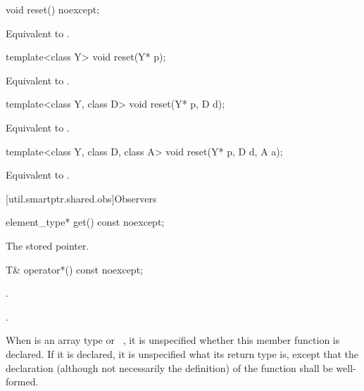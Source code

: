%
\begin{itemdecl}
void reset() noexcept;
\end{itemdecl}

\begin{itemdescr}
\pnum
\effects
Equivalent to .
\end{itemdescr}

%
\begin{itemdecl}
template<class Y> void reset(Y* p);
\end{itemdecl}

\begin{itemdescr}
\pnum
\effects
Equivalent to .
\end{itemdescr}

%
\begin{itemdecl}
template<class Y, class D> void reset(Y* p, D d);
\end{itemdecl}

\begin{itemdescr}
\pnum
\effects
Equivalent to .
\end{itemdescr}

%
\begin{itemdecl}
template<class Y, class D, class A> void reset(Y* p, D d, A a);
\end{itemdecl}

\begin{itemdescr}
\pnum
\effects
Equivalent to .
\end{itemdescr}

[util.smartptr.shared.obs]{Observers}
%
\begin{itemdecl}
element_type* get() const noexcept;
\end{itemdecl}

\begin{itemdescr}
\pnum
\returns
The stored pointer.
\end{itemdescr}

%
\begin{itemdecl}
T& operator*() const noexcept;
\end{itemdecl}

\begin{itemdescr}
\pnum
\expects
{}.

\pnum
\returns
{}.

\pnum
\remarks
When  is an array type or \cv{}~,
it is unspecified whether this
member function is declared. If it is declared, it is unspecified what its
return type is, except that the declaration (although not necessarily the
definition) of the function shall be well-formed.
\end{itemdescr}

